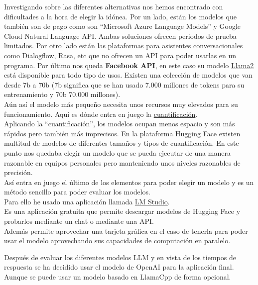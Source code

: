 Investigando sobre las diferentes alternativas nos hemos encontrado con 
dificultades a la hora de elegir la idónea.
Por un lado, están los modelos que también son de pago como son ``Microsoft Azure Language Models'' 
y Google Cloud Natural Language API. Ambas soluciones ofrecen periodos de prueba limitados.
Por otro lado están las plataformas para asistentes conversacionales como Dialogflow, Rasa, etc 
que no ofrecen un API para poder usarlas en un programa.
Por último nos queda \textbf{Facebook API}, en este caso su modelo 
\href{https://github.com/facebookresearch/llama}{Llama2} está disponible para todo tipo de usos.
Existen una colección de modelos que van desde 7b a 70b (7b significa que se han usado 
7.000 millones de tokens para su entrenamiento y 70b 70.000 millones).\\
Aún así el modelo más pequeño necesita unos recursos muy elevados para su funcionamiento. 
Aquí es dónde entra en juego la \href{https://es.wikipedia.org/wiki/Cuantificaci%C3%B3n_digital}{cuantificación}.\\
Aplicando la ``cuantificación'', los modelos ocupan menos espacio y son más rápidos pero también más imprecisos.
En la plataforma Hugging Face existen multitud de modelos de diferentes tamaños y tipos de cuantificación.
En este punto nos quedaba elegir un modelo que se pueda ejecutar de una manera razonable 
en equipos personales pero manteniendo unos niveles razonables de precisión.\\
Así entra en juego el último de los elementos para poder elegir un modelo y 
es un método sencillo para poder evaluar los modelos.\\
Para ello he usado una aplicación llamada \href{https://lmstudio.ai/}{LM Studio}.\\ 
Es una aplicación gratuita que permite descargar modelos de Hugging Face y 
probarlos mediante un chat o mediante una API.\\
Además permite aprovechar una tarjeta gráfica en el caso de tenerla 
para poder usar el modelo aprovechando sus capacidades de computación en paralelo.

Después de evaluar los diferentes modelos LLM y en vista de los tiempos de respuesta se ha decidido usar el modelo 
de OpenAI para la aplicación final. Aunque se puede usar un modelo basado en LlamaCpp de forma opcional.

